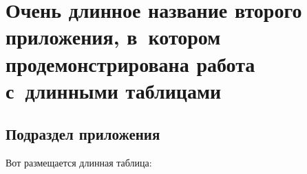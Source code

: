 \chapter{Очень длинное название второго приложения, в~котором продемонстрирована работа с~длинными таблицами}\label{app:B}

\section{Подраздел приложения}\label{app:B1}
Вот размещается длинная таблица:
\makeatletter
{} %
{%
\renewenvironment{longtable*}
  {\renewcommand\LTcaptype{}\longtable}
  {\endlongtable}
}
{
    {\addtocounter{table}{-1}}
    {}
}
\makeatother
\fontsize{10pt}{10pt}\selectfont

